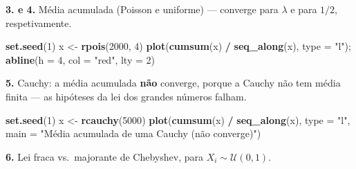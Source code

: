\documentclass[
  portuguese,
  11pt,
  openany]{book}
\newenvironment{Shaded}{\begin{snugshade}}{\end{snugshade}}
\newcommand{\AttributeTok}[1]{\textcolor[rgb]{0.13,0.29,0.53}{#1}}
\newcommand{\DecValTok}[1]{\textcolor[rgb]{0.00,0.00,0.81}{#1}}
\newcommand{\FunctionTok}[1]{\textcolor[rgb]{0.13,0.29,0.53}{\textbf{#1}}}
\newcommand{\NormalTok}[1]{#1}
\newcommand{\OtherTok}[1]{\textcolor[rgb]{0.56,0.35,0.01}{#1}}
\newcommand{\SpecialCharTok}[1]{\textcolor[rgb]{0.81,0.36,0.00}{\textbf{#1}}}
\newcommand{\StringTok}[1]{\textcolor[rgb]{0.31,0.60,0.02}{#1}}
\begin{document}
\textbf{3. e 4.} Média acumulada (Poisson e uniforme) --- converge para \(\lambda\) e para
\(1/2\), respetivamente.

\begin{Shaded}
\begin{Highlighting}[]
\FunctionTok{set.seed}\NormalTok{(}\DecValTok{1}\NormalTok{)}
\NormalTok{x }\OtherTok{\textless{}{-}} \FunctionTok{rpois}\NormalTok{(}\DecValTok{2000}\NormalTok{, }\DecValTok{4}\NormalTok{)}
\FunctionTok{plot}\NormalTok{(}\FunctionTok{cumsum}\NormalTok{(x) }\SpecialCharTok{/} \FunctionTok{seq\_along}\NormalTok{(x), }\AttributeTok{type =} \StringTok{"l"}\NormalTok{); }\FunctionTok{abline}\NormalTok{(}\AttributeTok{h =} \DecValTok{4}\NormalTok{, }\AttributeTok{col =} \StringTok{"red"}\NormalTok{, }\AttributeTok{lty =} \DecValTok{2}\NormalTok{)}
\end{Highlighting}
\end{Shaded}

\textbf{5.} Cauchy: a média acumulada \textbf{não} converge, porque a Cauchy não tem média
finita --- as hipóteses da lei dos grandes números falham.

\begin{Shaded}
\begin{Highlighting}[]
\FunctionTok{set.seed}\NormalTok{(}\DecValTok{1}\NormalTok{)}
\NormalTok{x }\OtherTok{\textless{}{-}} \FunctionTok{rcauchy}\NormalTok{(}\DecValTok{5000}\NormalTok{)}
\FunctionTok{plot}\NormalTok{(}\FunctionTok{cumsum}\NormalTok{(x) }\SpecialCharTok{/} \FunctionTok{seq\_along}\NormalTok{(x), }\AttributeTok{type =} \StringTok{"l"}\NormalTok{,}
     \AttributeTok{main =} \StringTok{"Média acumulada de uma Cauchy (não converge)"}\NormalTok{)}
\end{Highlighting}
\end{Shaded}

\textbf{6.} Lei fraca vs.~majorante de Chebyshev, para \(X_i \sim \mathcal{U}(0,1)\).
\end{document}
